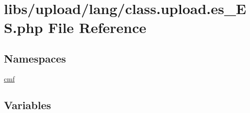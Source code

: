 \hypertarget{class_8upload_8es___e_s_8php}{}\section{libs/upload/lang/class.upload.\+es\+\_\+\+E\+S.\+php File Reference}
\label{class_8upload_8es___e_s_8php}
\subsection*{Namespaces}
\begin{DoxyCompactItemize}
\item 
 \hyperlink{namespacecmf}{cmf}
\end{DoxyCompactItemize}
\subsection*{Variables}

